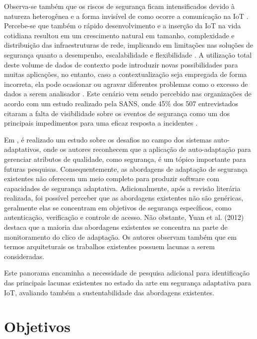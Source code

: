 \documentclass[tid,table]{texufpel} %
\begin{document}
Observa-se também que os riscos de segurança ficam intensificados devido à natureza heterogênea e a forma invisível de como ocorre a comunicação na IoT \cite{langheinrich10}. Percebe-se que também o rápido desenvolvimento e a inserção da IoT na vida cotidiana resultou em um  crescimento natural em tamanho, complexidade e distribuição das infraestruturas de rede, implicando em limitações nas soluções de segurança quanto a desempenho, escalabilidade e flexibilidade \cite{onwubiko12, liu08, ghorbani10, hu14}.  A utilização total deste volume de dados de contexto pode introduzir novas possibilidades para muitas aplicações, no entanto, caso a contextualização seja empregada de forma incorreta, ela pode ocasionar ou agravar diferentes problemas como o excesso de dados a serem analisador \cite{li15}. Este cenário vem sendo percebido nas organizações de acordo com um estudo realizado pela SANS, onde 45\% dos 507 entrevistados citaram a falta de visibilidade sobre os eventos de segurança como um dos principais impedimentos para uma eficaz resposta a incidentes \cite{sansir15}.
 
Em \cite{weyns12}, é realizado um estudo sobre os desafios no campo dos sistemas auto-adaptativos, onde os autores reconhecem que a aplicação de auto-adaptação para gerenciar atributos de qualidade, como segurança, é um tópico importante para futuras pesquisas. Consequentemente, as abordagens de adaptação de segurança existentes não oferecem um meio completo para produzir software com capacidades de segurança adaptativa. Adicionalmente, após a revisão literária realizada, foi possível perceber que as abordagens existentes não são genéricas, geralmente elas se concentram em objetivos de segurança específicos, como autenticação, verificação e controle de acesso. Não obstante, Yuan et al. (2012)\nocite{yuan12} destaca que a maioria das abordagens existentes se concentra na parte de monitoramento do clico de adaptação. Os autores observam também que em termos arquiteturais os trabalhos existentes possuem lacunas a serem consideradas. 

Este panorama encaminha a necessidade de pesquisa adicional para identificação das principais lacunas existentes no estado da arte em segurança adaptativa para IoT, avaliando também a sustentabilidade das abordagens existentes.

\section{Objetivos}
\end{document}
